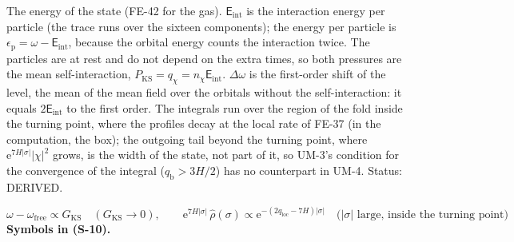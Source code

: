 \documentclass[
  10pt,
]{article}
\begin{document}
The energy of the state (FE-42 for the gas).
\(\mathsf{E}_{\mathrm{int}}\) is the interaction energy per particle
(the trace runs over the sixteen components); the energy per particle is
\(\epsilon_{\mathrm{p}} = \omega - \mathsf{E}_{\mathrm{int}}\), because
the orbital energy counts the interaction twice. The particles are at
rest and do not depend on the extra times, so both pressures are the
mean self-interaction,
\(P_{\mathrm{KS}} = q_\chi = n_\chi\mathsf{E}_{\mathrm{int}}\).
\(\Delta\omega\) is the first-order shift of the level, the mean of the
mean field over the orbitals without the self-interaction: it equals
\(2\mathsf{E}_{\mathrm{int}}\) to the first order. The integrals run
over the region of the fold inside the turning point, where the profiles
decay at the local rate of FE-37 (in the computation, the box); the
outgoing tail beyond the turning point, where
\(\mathrm{e}^{7H\lvert\sigma\rvert}\lvert\chi\rvert^2\) grows, is the
width of the state, not part of it, so UM-3's condition for the
convergence of the integral (\(q_{\mathrm{b}} > 3H/2\)) has no
counterpart in UM-4. Status: DERIVED.

\[
\omega - \omega_{\mathrm{free}} \propto G_{\mathrm{KS}}\quad(G_{\mathrm{KS}} \to 0),\qquad
\mathrm{e}^{7H\lvert\sigma\rvert}\,\hat\rho(\sigma) \propto \mathrm{e}^{-(2q_{\mathrm{loc}} - 7H)\lvert\sigma\rvert}\quad\big(\lvert\sigma\rvert \text{ large, inside the turning point}\big) \tag{S-10}
\] \textbf{Symbols in (S-10).}
\end{document}
